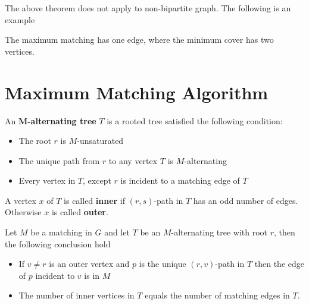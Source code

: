 				The above theorem does not apply to non-bipartite graph. The following is an example
				\begin{figure}[!ht]
					\centering
				\end{figure}

				The maximum matching has one edge, where the minimum cover has two vertices.

			\section{Maximum Matching Algorithm}
				\begin{definition}
					An \textbf{M-alternating tree} $T$ is a rooted tree satisfied the following condition:
					\begin{itemize}
						\item The root $r$ is $M$-unsaturated
						\item The unique path from $r$ to any vertex $T$ is $M$-alternating
						\item Every vertex in $T$, except $r$ is incident to a matching edge of $T$
					\end{itemize}
					A vertex $x$ of $T$ is called \textbf{inner} if $(r, s)$-path in $T$ has an odd number of edges. Otherwise $x$ is called \textbf{outer}.
				\end{definition}

				\begin{lemma}
					Let $M$ be a matching in $G$ and let $T$ be an $M$-alternating tree with root $r$, then the following conclusion hold
					\begin{itemize}
						\item If $v \neq r$ is an outer vertex and $p$ is the unique $(r,v)$-path in $T$ then the edge of $p$ incident to $v$ is in $M$
						\item The number of inner vertices in $T$ equals the number of matching edges in $T$.
					\end{itemize}
				\end{lemma}


